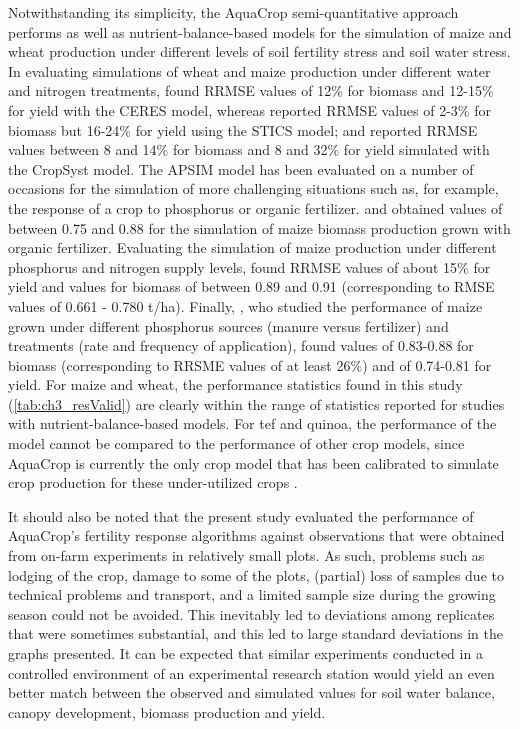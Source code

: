 Notwithstanding its simplicity, the AquaCrop semi-quantitative approach performs as well as nutrient-balance-based models for the simulation of maize and wheat production under different levels of soil fertility stress and soil water stress. In evaluating simulations of wheat and maize production under different water and nitrogen treatments, \textcite{fang2008} found RRMSE values of 12\% for biomass and 12-15\% for yield with the CERES model, whereas \textcite{brisson2002} reported RRMSE values of 2-3\% for biomass but 16-24\% for yield using the STICS model; and \textcite{stockle2003} reported RRMSE values between 8 and 14\% for biomass and 8 and 32\% for yield simulated with the CropSyst model. The APSIM model has been evaluated on a number of occasions for the simulation of more challenging situations such as, for example, the response of a crop to phosphorus or organic fertilizer. \textcite{micheni2004} and \textcite{kinyangi2004} obtained \Rsq values of between 0.75 and 0.88 for the simulation of maize biomass production grown with organic fertilizer. Evaluating the simulation of maize production under different phosphorus and nitrogen supply levels, \textcite{fosumensah2012} found RRMSE values of about 15\% for yield and \Rsq values for biomass of between 0.89 and 0.91 (corresponding to RMSE values of 0.661 - 0.780 \si{t/ha}). Finally, \textcite{delve2009}, who studied the performance of maize grown under different phosphorus sources (manure versus fertilizer) and treatments (rate and frequency of application), found \Rsq values of 0.83-0.88 for biomass (corresponding to RRSME values of at least 26\%) and of 0.74-0.81 for yield. For maize and wheat, the performance statistics found in this study (\autoref{tab:ch3_resValid}) are clearly within the range of statistics reported for studies with nutrient-balance-based models. For tef and quinoa, the performance of the model cannot be compared to the performance of other crop models, since AquaCrop is currently the only crop model that has been calibrated to simulate crop production for these under-utilized crops \parencite{geerts2009, tsegay2012}.

It should also be noted that the present study evaluated the performance of AquaCrop's fertility response algorithms against observations that were obtained from on-farm experiments in relatively small plots. As such, problems such as lodging of the crop, damage to some of the plots, (partial) loss of samples due to technical problems and transport, and a limited sample size during the growing season could not be avoided. This inevitably led to deviations among replicates that were sometimes substantial, and this led to large standard deviations in the graphs presented. It can be expected that similar experiments conducted in a controlled environment of an experimental research station would yield an even better match between the observed and simulated values for soil water balance, canopy development, biomass production and yield.


